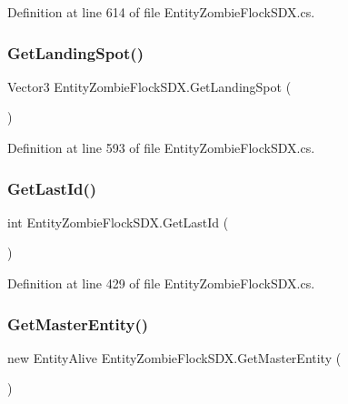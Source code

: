 Definition at line 614 of file Entity\+Zombie\+Flock\+S\+D\+X.\+cs.

\mbox{\label{class_entity_zombie_flock_s_d_x_a71d431779b9e6541ff31f6bc8d3d5009}} 
\subsubsection{\texorpdfstring{GetLandingSpot()}{GetLandingSpot()}}
{\footnotesize\ttfamily Vector3 Entity\+Zombie\+Flock\+S\+D\+X.\+Get\+Landing\+Spot (\begin{DoxyParamCaption}{ }\end{DoxyParamCaption})}



Definition at line 593 of file Entity\+Zombie\+Flock\+S\+D\+X.\+cs.

\mbox{\label{class_entity_zombie_flock_s_d_x_a2a69b88e7da168d3179a04f2a896ecb6}} 
\subsubsection{\texorpdfstring{GetLastId()}{GetLastId()}}
{\footnotesize\ttfamily int Entity\+Zombie\+Flock\+S\+D\+X.\+Get\+Last\+Id (\begin{DoxyParamCaption}{ }\end{DoxyParamCaption})}



Definition at line 429 of file Entity\+Zombie\+Flock\+S\+D\+X.\+cs.

\mbox{\label{class_entity_zombie_flock_s_d_x_a036371f56bc32a1588d860af64372ced}} 
\subsubsection{\texorpdfstring{GetMasterEntity()}{GetMasterEntity()}}
{\footnotesize\ttfamily new Entity\+Alive Entity\+Zombie\+Flock\+S\+D\+X.\+Get\+Master\+Entity (\begin{DoxyParamCaption}{ }\end{DoxyParamCaption})}



